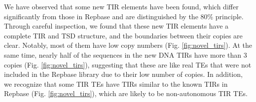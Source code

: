 \documentclass{bmcart}
\begin{document}



We have observed that some new TIR elements have been found, which differ significantly from those in Repbase and are distinguished by the 80\% principle\cite{wicker2007unified}. Through careful inspection, we found that these new TIR elements have a complete TIR and TSD structure, and the boundaries between their copies are clear. Notably, most of them have low copy numbers (Fig. \ref{fig:novel_tirs}). At the same time, nearly half of the sequences in the new DNA TIRs have more than 3 copies (Fig. \ref{fig:novel_tirs}), suggesting that these are like real TEs that were not included in the Repbase library due to their low number of copies.
In addition, we recognize that some TIR TEs have TIRs similar to the known TIRs in Repbase (Fig. \ref{fig:novel_tirs}), which are likely to be non-autonomous TIR TEs.
\end{document}
